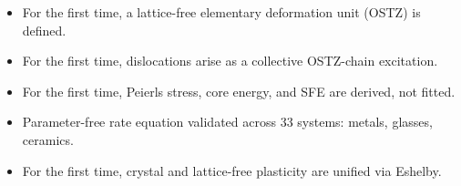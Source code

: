 \documentclass{article}
\begin{document}
\begin{itemize}
\item For the first time, a lattice-free elementary deformation unit (OSTZ) is defined.
\item For the first time, dislocations arise as a collective OSTZ-chain excitation.
\item For the first time, Peierls stress, core energy, and SFE are derived, not fitted.
\item Parameter-free rate equation validated across 33 systems: metals, glasses, ceramics.
\item For the first time, crystal and lattice-free plasticity are unified via Eshelby.
\end{itemize}
\end{document}
